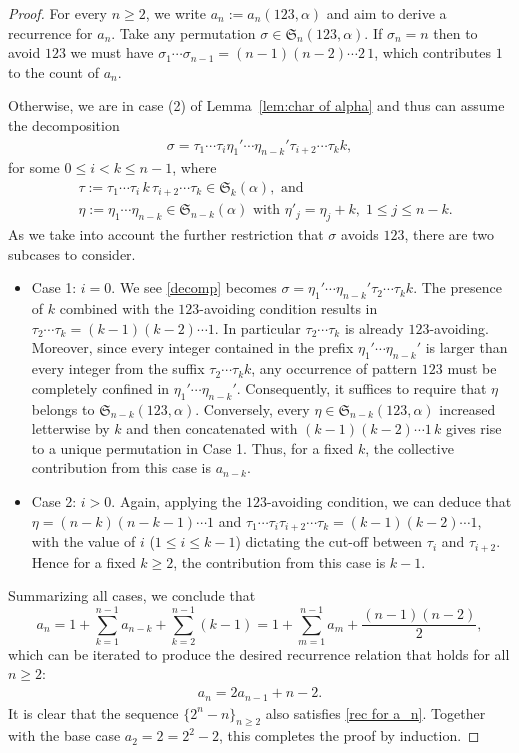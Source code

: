 \documentclass[12pt]{amsart}
\numberwithin{equation}{section}
\theoremstyle{plain}
\def\fS{\mathfrak{S}}
\begin{document}
\begin{proof}
For every $n\ge 2$, we write $a_n:=a_n(123,\alpha)$ and aim to derive a recurrence for $a_n$. Take any permutation $\sigma\in\fS_n(123,\alpha)$. If $\sigma_n=n$ then to avoid $123$ we must have $\sigma_1\cdots\sigma_{n-1}=(n-1)(n-2)\cdots 2\, 1$, which contributes $1$ to the count of $a_n$.

Otherwise, we are in case (2) of Lemma~\ref{lem:char of alpha} and thus can assume the decomposition
\begin{align}
	\sigma=\tau_1\cdots\tau_i \eta_1'\cdots\eta_{n-k}'\tau_{i+2}\cdots\tau_{k}k,\label{decomp}
\end{align}
for some $0\le i < k\le n-1$, where
\begin{align*}
	&\tau:=\tau_1\cdots\tau_i\,k\,\tau_{i+2}\cdots\tau_k\in \fS_k(\alpha), \text{ and}\\
	&\eta:=\eta_1\cdots\eta_{n-k}\in \fS_{n-k}(\alpha) \text{ with } \eta'_j=\eta_j+k,\; 1\le j\le n-k.
\end{align*}
 As we take into account the further restriction that $\sigma$ avoids $123$, there are two subcases to consider.

\begin{itemize}
\item Case 1: $i=0$. We see \eqref{decomp} becomes $\sigma=\eta_1'\cdots\eta_{n-k}'\tau_{2}\cdots\tau_{k}k$. The presence of $k$ combined with the $123$-avoiding condition results in $\tau_{2}\cdots\tau_{k}=(k-1)(k-2)\cdots 1$. In particular $\tau_{2}\cdots\tau_{k}$ is already $123$-avoiding. Moreover, since every integer contained in the prefix $\eta_1'\cdots\eta_{n-k}'$ is larger than every integer from the suffix $\tau_2\cdots\tau_k k$, any occurrence of pattern $123$ must be completely confined in $\eta_1'\cdots\eta_{n-k}'$. Consequently, it suffices to require that $\eta$ belongs to $\fS_{n-k}(123,\alpha)$. Conversely, every $\eta\in\fS_{n-k}(123,\alpha)$ increased letterwise by $k$ and then concatenated with $(k-1)(k-2)\cdots 1\, k$ gives rise to a unique permutation in Case 1. Thus, for a fixed $k$, the collective contribution from this case is $a_{n-k}$.

\item Case 2: $i>0$. Again, applying the $123$-avoiding condition, we can deduce that $\eta=(n-k)(n-k-1)\cdots 1$ and $\tau_1\cdots\tau_i\tau_{i+2}\cdots\tau_k=(k-1)(k-2)\cdots 1$, with the value of $i$ ($1\le i\le k-1$) dictating the cut-off between $\tau_i$ and $\tau_{i+2}$. Hence for a fixed $k\ge 2$, the contribution from this case is $k-1$.
\end{itemize}

Summarizing all cases, we conclude that
\[
a_n
=
1+\sum_{k=1}^{n-1}a_{n-k}+\sum_{k=2}^{n-1}(k-1)
=
1+\sum_{m=1}^{n-1}a_m+\frac{(n-1)(n-2)}{2},
\]
which can be iterated to produce the desired recurrence relation that holds for all $n\ge 2$:
\begin{align}\label{rec for a_n}
a_n=2a_{n-1}+n-2.
\end{align}
It is clear that the sequence $\{2^n-n\}_{n\ge 2}$ also satisfies \eqref{rec for a_n}. Together with the base case $a_2=2=2^2-2$, this completes the proof by induction.
\end{proof}
\end{document}
